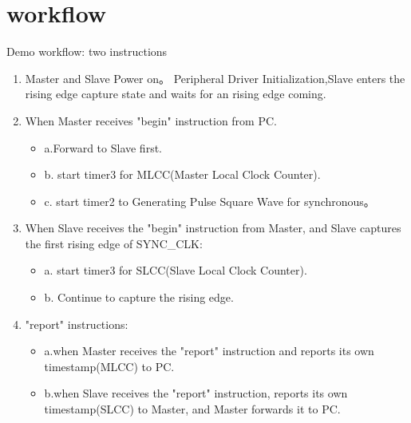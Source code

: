 \section{workflow}

\begin{frame}[fragile]{Demo workflow: two instructions}

\begin{enumerate}
\item Master and Slave Power on。 Peripheral Driver Initialization,Slave enters the rising edge capture state and waits for an rising edge coming.
\item When Master receives  "begin" instruction from PC.
  \begin{itemize}
    \item a.Forward to Slave first.
    \item b. start  timer3 for  MLCC(Master Local Clock Counter).
    \item c.  start timer2 to Generating Pulse Square Wave for synchronous。
  \end{itemize}
\item When Slave receives the "begin" instruction from Master, and Slave captures the first rising edge of SYNC\_CLK:
  \begin{itemize}
    \item a.  start  timer3 for  SLCC(Slave Local Clock Counter).
    \item b. Continue to capture the rising edge.

  \end{itemize}
\item "report" instructions:
\begin{itemize}
  \item a.when Master receives the "report" instruction and reports its own timestamp(MLCC) to PC.
  \item b.when Slave receives the "report" instruction, reports its own timestamp(SLCC) to Master, and Master forwards it to PC.

\end{itemize}

\end{enumerate}


\end{frame}



